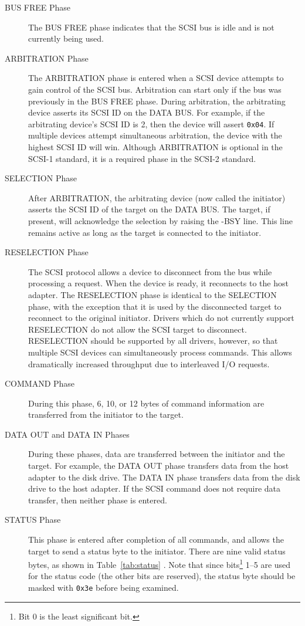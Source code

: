 \begin{description}
\item[BUS FREE Phase] The BUS FREE phase indicates that the SCSI bus is
  idle and is not currently being used.
\item[ARBITRATION Phase] The ARBITRATION phase is entered when a SCSI
  device attempts to gain control of the SCSI bus.  Arbitration can start
  only if the bus was previously in the BUS FREE phase.  During
  arbitration, the arbitrating device asserts its SCSI ID on the DATA
  BUS\@.  For example, if the arbitrating device's SCSI ID is 2, then the
  device will assert {\tt 0x04}\@.  If multiple devices attempt
  simultaneous arbitration, the device with the highest SCSI ID will win.
  Although ARBITRATION is optional in the SCSI-1 standard, it is a required
  phase in the SCSI-2 standard.
\item[SELECTION Phase] After ARBITRATION, the arbitrating device (now
  called the initiator) asserts the SCSI ID of the target on the DATA
  BUS\@.  The target, if present, will acknowledge the selection by raising
  the -BSY line.  This line remains active as long as the target is
  connected to the initiator.
\item[RESELECTION Phase] The SCSI protocol allows a device to disconnect
  from the bus while processing a request.  When the device is ready, it
  reconnects to the host adapter.  The RESELECTION phase is identical to
  the SELECTION phase, with the exception that it is used by the
  disconnected target to reconnect to the original initiator.  Drivers
  which do not currently support RESELECTION do not allow the SCSI target
  to disconnect.  RESELECTION should be supported by all drivers, however,
  so that multiple SCSI devices can simultaneously process commands.  This
  allows dramatically increased throughput due to interleaved I/O requests.
\item[COMMAND Phase] During this phase, 6, 10, or 12 bytes of command
  information are transferred from the initiator to the target.
\item[DATA OUT and DATA IN Phases] During these phases, data are
  transferred between the initiator and the target.  For example, the DATA
  OUT phase transfers data from the host adapter to the disk drive.  The
  DATA IN phase transfers data from the disk drive to the host adapter.  If
  the SCSI command does not require data transfer, then neither phase is
  entered.
\item[STATUS Phase] This phase is entered after completion of all commands,
  and allows the target to send a status byte to the initiator.  There are
  nine valid status bytes, as shown in Table~\ref{tab:status}
  \cite[p.~77]{scsi2.standard}.  Note that since bits\footnote{Bit 0 is the
    least significant bit.} 1--5 are used for the status code (the other
  bits are reserved), the status byte should be masked with \verb|0x3e|
  before being examined.


\end{description}
